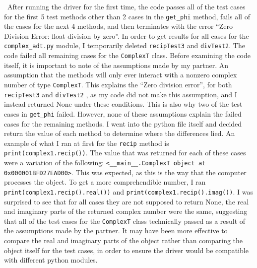 \documentclass[12pt]{article}
\begin{document}
~\newline\noindent After running the driver for the first time, the code passes all of the test cases for the first 5 test methods other than 2 cases in the \verb |get_phi| method, fails all of the cases for the next 4 methods, and then terminates with the error “Zero Division Error: float division by zero”. In order to get results for all cases for the \verb |complex_adt.py| module, I temporarily deleted \verb |recipTest3| and \verb |divTest2|. The code failed all remaining cases for the \verb |ComplexT| class. Before examining the code itself, it is important to note of the assumptions made by my partner. An assumption that the methods will only ever interact with a nonzero complex number of type \verb |ComplexT|. This explains the “Zero division error”, for both \verb |recipTest3| and \verb |divTest2| , as my code did not make this assumption, and I instead returned None under these conditions. This is also why two of the test cases in \verb |get_phi| failed. However, none of these assumptions explain the failed cases for the remaining methods. I went into the python file itself and decided return the value of each method to determine where the differences lied. An example of what I ran at first for the \verb |recip| method is \verb |print(complex1.recip())|. The value that was returned for each of these cases were a variation of the following: \verb |<__main__.ComplexT object at 0x000001BFD27EAD00>|. This was expected, as this is the way that the computer processes the object. To get a more comprehendible number, I ran \verb |print(complex1.recip().real())| and \verb |print(complex1.recip().imag())|. I was surprised to see that for all cases they are not supposed to return None, the real and imaginary parts of the returned complex number were the same, suggesting that all of the test cases for the \verb |ComplexT| class technically passed as a result of the assumptions made by the partner. It may have been more effective to compare the real and imaginary parts of the object rather than comparing the object itself for the test cases, in order to ensure the driver would be compatible with different python modules.

\newpage 
\end{document}
